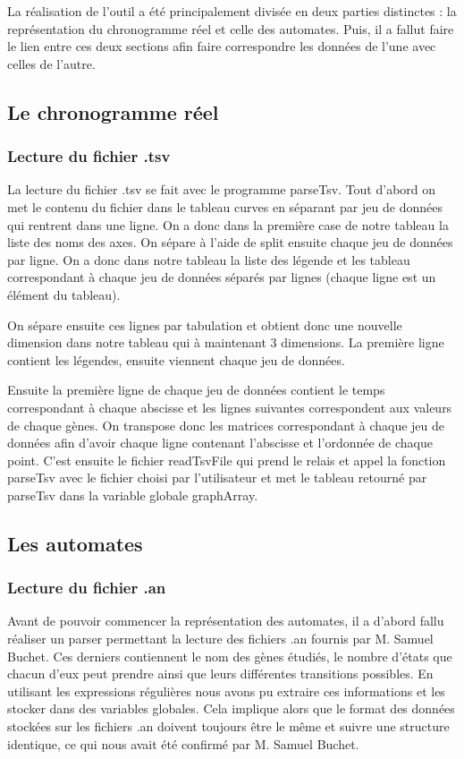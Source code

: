 La réalisation de l'outil a été principalement divisée en deux parties distinctes : la représentation du chronogramme réel et celle des automates. Puis, il a fallut faire le lien entre ces deux sections afin faire correspondre les données de l'une avec celles de l'autre. 
\bigbreak
\subsection{Le chronogramme réel}
\bigbreak
\subsubsection{Lecture du fichier .tsv}
\bigbreak
La lecture du fichier .tsv se fait avec le programme parseTsv. Tout d’abord on met le contenu du fichier dans le tableau curves en séparant par jeu de données qui rentrent dans une ligne. On a donc dans la première case de notre tableau la liste des noms des axes. 
On sépare à l’aide de split ensuite chaque jeu de données par ligne. 
On a donc dans notre tableau la liste des légende et les tableau correspondant à chaque jeu de données séparés par lignes (chaque ligne est un élément du tableau).

On sépare ensuite ces lignes par tabulation et obtient donc une nouvelle dimension dans notre tableau qui à maintenant 3 dimensions. 
La première ligne contient les légendes, ensuite viennent chaque jeu de données.

Ensuite la première ligne de chaque jeu de données contient le temps correspondant à chaque abscisse et les lignes suivantes correspondent aux valeurs de chaque gènes.
On transpose donc les matrices correspondant à chaque jeu de données afin d’avoir chaque ligne contenant l’abscisse et l’ordonnée de chaque point.
C’est ensuite le fichier readTsvFile qui prend le relais et appel la fonction parseTsv avec le fichier choisi par l’utilisateur et met le tableau retourné par parseTsv dans la variable globale graphArray.

\bigbreak


\subsection{Les automates}

\bigbreak
\subsubsection{Lecture du fichier .an }
Avant de pouvoir commencer la représentation des automates, il a d'abord fallu réaliser un parser permettant la lecture des fichiers .an fournis par M. Samuel Buchet. Ces derniers contiennent le nom des gènes étudiés, le nombre d'états que chacun d'eux peut prendre ainsi que leurs différentes transitions possibles. En utilisant les expressions régulières nous avons pu extraire ces informations et les stocker dans des variables globales. Cela implique alors que le format des données stockées sur les fichiers .an doivent toujours être le même et suivre une structure identique, ce qui nous avait été confirmé par M. Samuel Buchet. 
\bigbreak
